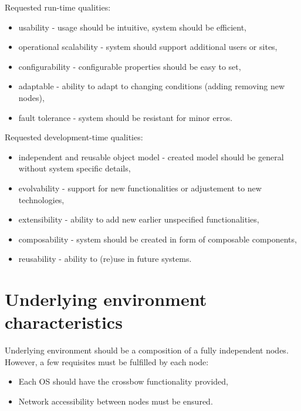 \documentclass[11pt]{book}
\begin{document}
                \medskip
		
		Requested run-time qualities:
		\begin{itemize}
			\item{usability - usage should be intuitive, system should be efficient,}
			\item{operational scalability - system should support additional users or sites, }
			\item{configurability - configurable properties should be easy to set,}
			\item{adaptable - ability to adapt to changing conditions (adding removing new nodes),}
			\item{fault tolerance - system should be resistant for minor erros.}
		\end{itemize}
		
		\medskip
		
		Requested development-time qualities:
		\begin{itemize}
			\item{independent and reusable object model - created model should be general without system specific details, }
			\item{evolvability - support for new functionalities or adjustement to new technologies,}
			\item{extensibility - ability to add new earlier unspecified functionalities, }
			\item{composability - system should be created in form of composable components, }
			\item{reusability - ability to (re)use in future systems.}
		\end{itemize}
		

    \section{Underlying environment characteristics}
	
		Underlying environment should be a composition of a fully independent nodes. However, a few requisites
		must be fulfilled by each node:
		
		\begin{itemize}
			\item{Each OS should have the crossbow functionality provided, }
			\item{Network accessibility between nodes must be ensured. }
		\end{itemize}
		
\end{document}
